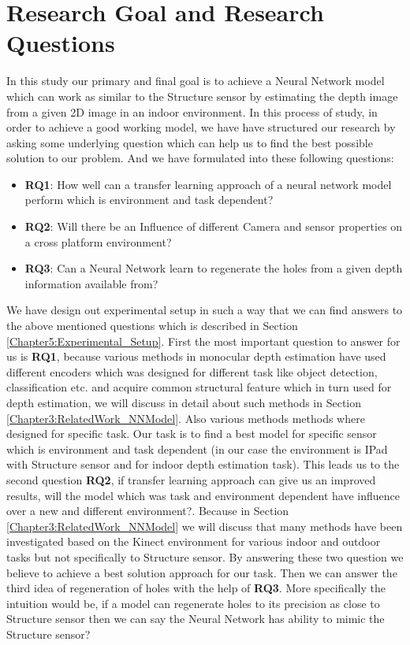 \section{Research Goal and Research Questions}
In this study our primary and final goal is to achieve a Neural Network model which can work as similar to the Structure sensor by estimating the depth image from a given 2D image in an indoor environment. In this process of study, in order to achieve a good working model, we have have structured our research by asking some underlying question which can help us to find the best possible solution to our problem. And we have formulated into these following questions:

\begin{itemize}
    \item \textbf{RQ1}: How well can a transfer learning approach of a neural network model perform which is environment and task dependent?
    \item \textbf{RQ2}: Will there be an Influence of different Camera and sensor properties on a cross platform environment?    
    \item \textbf{RQ3}: Can a Neural Network learn to regenerate the holes from a given depth information available from?
\end{itemize}

We have design out experimental setup in such a way that we can find answers to the above mentioned questions which is described in Section \ref{Chapter5:Experimental_Setup}. First the most important question to answer for us is  \textbf{RQ1}, because various methods in monocular depth estimation have used different encoders which was designed for different task like object detection, classification etc. and acquire common structural feature which in turn used  for depth estimation, we will discuss in detail about such methods in Section \ref{Chapter3:RelatedWork_NNModel}. Also various methods methods where designed for specific task. Our task is to find a best model for specific sensor which is environment and task dependent (in our case the environment is IPad with Structure sensor and for indoor depth estimation task). This leads us to the second question \textbf{RQ2}, if transfer learning approach can give us an improved results, will the model which was task and environment dependent have influence over a new and different environment?. Because in Section \ref{Chapter3:RelatedWork_NNModel} we will discuss that many methods have been investigated based on the Kinect environment for various indoor and outdoor tasks but not specifically to Structure sensor.  By answering these two question we believe to achieve a best solution approach for our task. Then we can answer the third idea of regeneration of holes with the help of \textbf{RQ3}. More specifically the intuition would be, if a model can regenerate holes to its precision as close to Structure sensor then we can say the Neural Network has ability to mimic the Structure sensor? 

